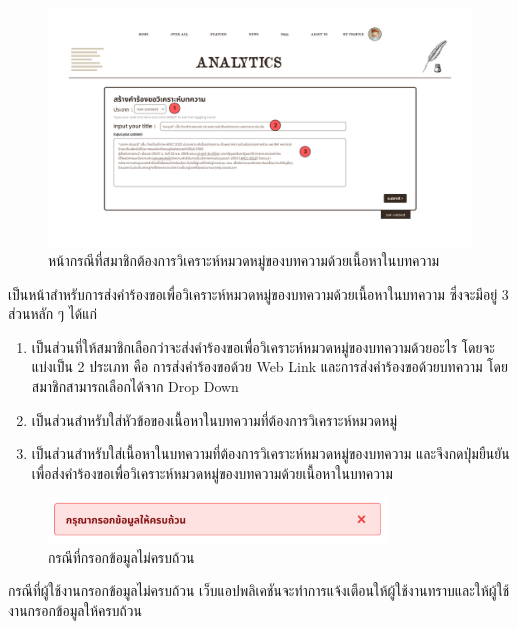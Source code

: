 \documentclass[12pt,oneside,openright,a4paper]{cpe-thai-project}
\begin{document}
\begin{figure}[!ht]\centering
  \includegraphics[width=16cm]{./img/project_ui/content.png} 
  \caption{หน้ากรณีที่สมาชิกต้องการวิเคราะห์หมวดหมู่ของบทความด้วยเนื้อหาในบทความ}\label{fig:raw_content} 
\end{figure}
\hspace*{1cm}เป็นหน้าสำหรับการส่งคำร้องขอเพื่อวิเคราะห์หมวดหมู่ของบทความด้วยเนื้อหาในบทความ ซึ่งจะมีอยู่ 3 ส่วนหลัก ๆ ได้แก่
\begin{enumerate}
  \item เป็นส่วนที่ให้สมาชิกเลือกว่าจะส่งคำร้องขอเพื่อวิเคราะห์หมวดหมู่ของบทความด้วยอะไร โดยจะแบ่งเป็น 2 ประเภท คือ 
        การส่งคำร้องขอด้วย Web Link และการส่งคำร้องขอด้วยบทความ โดยสมาชิกสามารถเลือกได้จาก Drop Down
  \item เป็นส่วนสำหรับใส่หัวข้อของเนื้อหาในบทความที่ต้องการวิเคราะห์หมวดหมู่
  \item เป็นส่วนสำหรับใส่เนื้อหาในบทความที่ต้องการวิเคราะห์หมวดหมู่ของบทความ และจึงกดปุ่มยืนยันเพื่อส่งคำร้องขอเพื่อวิเคราะห์หมวดหมู่ของบทความด้วยเนื้อหาในบทความ
\end{enumerate}
\begin{figure}[!ht]\centering
  \includegraphics[width=9cm]{./img/project_ui/all_inform.png} 
  \caption{กรณีที่กรอกข้อมูลไม่ครบถ้วน}\label{fig:cont_info} 
\end{figure}
\hspace*{1cm}กรณีที่ผู้ใช้งานกรอกข้อมูลไม่ครบถ้วน เว็บแอปพลิเคชันจะทำการแจ้งเตือนให้ผู้ใช้งานทราบและให้ผู้ใช้งานกรอกข้อมูลให้ครบถ้วน \newpage
\end{document}
